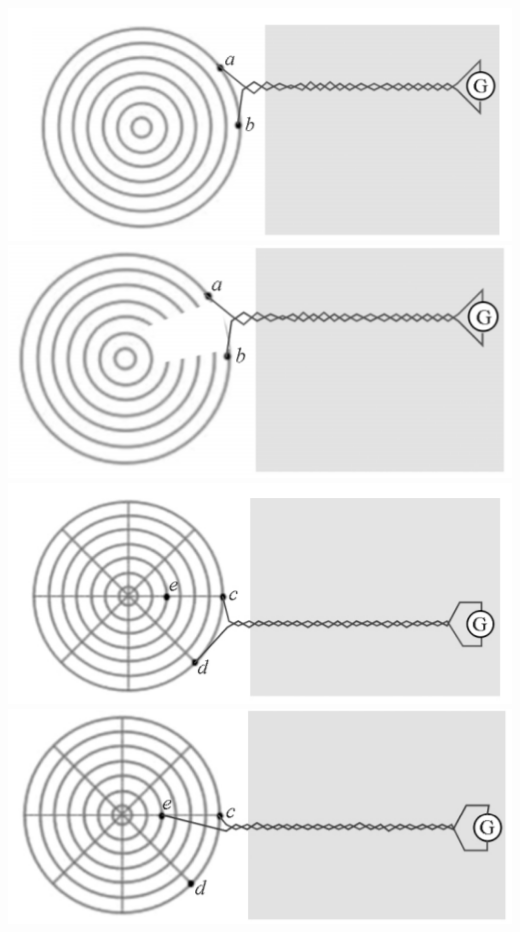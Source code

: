 \documentclass{CLGPY}
\begin{document}
\begin{multicols}{1}
        \begin{center}
            \includegraphics[scale=.3]{./fig/20210619133325.png}\\[3pt]
            \includegraphics[scale=.3]{./fig/20210619133334.png}\\[3pt]
            \includegraphics[scale=.3]{./fig/20210619133344.png}\\[3pt]
            \includegraphics[scale=.3]{./fig/20210619133353.png}
        \end{center}

\end{multicols}
\end{document}
